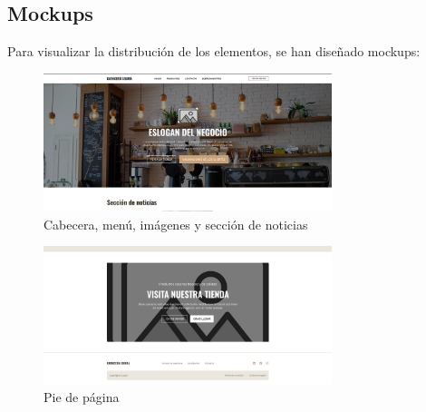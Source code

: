 \documentclass[a4paper]{article}
\begin{document}
\subsection{Mockups}

Para visualizar la distribución de los elementos, se han diseñado mockups:

\begin{figure}[H]
    \centering
    \includegraphics[width=0.75\textwidth]{images/mockup-1.png}
    \captionsetup{width=0.7\textwidth}
    \caption{Cabecera, menú, imágenes y sección de noticias}
\end{figure}

\begin{figure}[H]
    \centering
    \includegraphics[width=0.75\textwidth]{images/mockup-2.png}
    \captionsetup{width=0.7\textwidth}
    \caption{Pie de página}
\end{figure}
\end{document}
